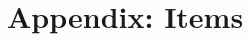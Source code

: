 \documentclass[floatsintext,doc]{apa6}
\begin{document}
%

\newpage
\hypertarget{appendix-items}{%
\section{Appendix: Items}\label{appendix-items}}

\setcounter{table}{0} \renewcommand{\thetable}{A\arabic{table}}
\end{document}
